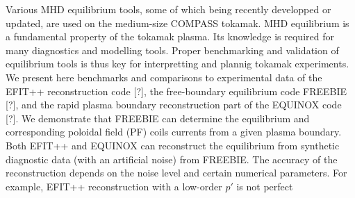 Various MHD equilibrium tools, some of which being recently developped or updated, are used on the medium-size COMPASS tokamak. MHD equilibrium is a fundamental property of the tokamak plasma. Its knowledge is required for many diagnostics and modelling tools. Proper benchmarking and validation of equilibrium tools is thus key for interpretting and plannig tokamak experiments. We present here benchmarks and comparisons to experimental data of the EFIT++ reconstruction code [?], the free-boundary equilibrium code FREEBIE [?], and the rapid plasma boundary reconstruction part of the EQUINOX code [?]. We demonstrate that FREEBIE can determine the equilibrium and corresponding poloidal field (PF) coils currents from a given plasma boundary. Both EFIT++ and EQUINOX can reconstruct the equilibrium from synthetic diagnostic data (with an artificial noise) from FREEBIE. The accuracy of the reconstruction depends on the noise level and certain numerical parameters. For example, EFIT++ reconstruction with a low-order $p\prime$ is not perfect